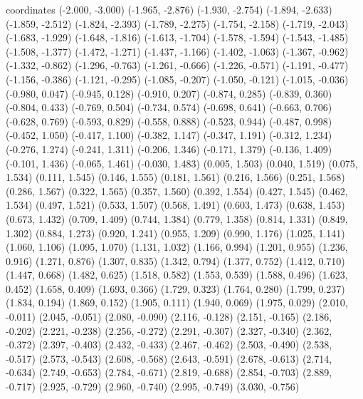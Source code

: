  coordinates {
  (-2.000, -3.000)
  (-1.965, -2.876)
  (-1.930, -2.754)
  (-1.894, -2.633)
  (-1.859, -2.512)
  (-1.824, -2.393)
  (-1.789, -2.275)
  (-1.754, -2.158)
  (-1.719, -2.043)
  (-1.683, -1.929)
  (-1.648, -1.816)
  (-1.613, -1.704)
  (-1.578, -1.594)
  (-1.543, -1.485)
  (-1.508, -1.377)
  (-1.472, -1.271)
  (-1.437, -1.166)
  (-1.402, -1.063)
  (-1.367, -0.962)
  (-1.332, -0.862)
  (-1.296, -0.763)
  (-1.261, -0.666)
  (-1.226, -0.571)
  (-1.191, -0.477)
  (-1.156, -0.386)
  (-1.121, -0.295)
  (-1.085, -0.207)
  (-1.050, -0.121)
  (-1.015, -0.036)
  (-0.980, 0.047)
  (-0.945, 0.128)
  (-0.910, 0.207)
  (-0.874, 0.285)
  (-0.839, 0.360)
  (-0.804, 0.433)
  (-0.769, 0.504)
  (-0.734, 0.574)
  (-0.698, 0.641)
  (-0.663, 0.706)
  (-0.628, 0.769)
  (-0.593, 0.829)
  (-0.558, 0.888)
  (-0.523, 0.944)
  (-0.487, 0.998)
  (-0.452, 1.050)
  (-0.417, 1.100)
  (-0.382, 1.147)
  (-0.347, 1.191)
  (-0.312, 1.234)
  (-0.276, 1.274)
  (-0.241, 1.311)
  (-0.206, 1.346)
  (-0.171, 1.379)
  (-0.136, 1.409)
  (-0.101, 1.436)
  (-0.065, 1.461)
  (-0.030, 1.483)
  (0.005, 1.503)
  (0.040, 1.519)
  (0.075, 1.534)
  (0.111, 1.545)
  (0.146, 1.555)
  (0.181, 1.561)
  (0.216, 1.566)
  (0.251, 1.568)
  (0.286, 1.567)
  (0.322, 1.565)
  (0.357, 1.560)
  (0.392, 1.554)
  (0.427, 1.545)
  (0.462, 1.534)
  (0.497, 1.521)
  (0.533, 1.507)
  (0.568, 1.491)
  (0.603, 1.473)
  (0.638, 1.453)
  (0.673, 1.432)
  (0.709, 1.409)
  (0.744, 1.384)
  (0.779, 1.358)
  (0.814, 1.331)
  (0.849, 1.302)
  (0.884, 1.273)
  (0.920, 1.241)
  (0.955, 1.209)
  (0.990, 1.176)
  (1.025, 1.141)
  (1.060, 1.106)
  (1.095, 1.070)
  (1.131, 1.032)
  (1.166, 0.994)
  (1.201, 0.955)
  (1.236, 0.916)
  (1.271, 0.876)
  (1.307, 0.835)
  (1.342, 0.794)
  (1.377, 0.752)
  (1.412, 0.710)
  (1.447, 0.668)
  (1.482, 0.625)
  (1.518, 0.582)
  (1.553, 0.539)
  (1.588, 0.496)
  (1.623, 0.452)
  (1.658, 0.409)
  (1.693, 0.366)
  (1.729, 0.323)
  (1.764, 0.280)
  (1.799, 0.237)
  (1.834, 0.194)
  (1.869, 0.152)
  (1.905, 0.111)
  (1.940, 0.069)
  (1.975, 0.029)
  (2.010, -0.011)
  (2.045, -0.051)
  (2.080, -0.090)
  (2.116, -0.128)
  (2.151, -0.165)
  (2.186, -0.202)
  (2.221, -0.238)
  (2.256, -0.272)
  (2.291, -0.307)
  (2.327, -0.340)
  (2.362, -0.372)
  (2.397, -0.403)
  (2.432, -0.433)
  (2.467, -0.462)
  (2.503, -0.490)
  (2.538, -0.517)
  (2.573, -0.543)
  (2.608, -0.568)
  (2.643, -0.591)
  (2.678, -0.613)
  (2.714, -0.634)
  (2.749, -0.653)
  (2.784, -0.671)
  (2.819, -0.688)
  (2.854, -0.703)
  (2.889, -0.717)
  (2.925, -0.729)
  (2.960, -0.740)
  (2.995, -0.749)
  (3.030, -0.756)
}
